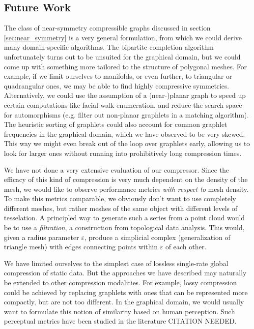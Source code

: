 \documentclass{egpubl}
\begin{document}
\subsection{Future Work}


The class of near-symmetry compressible graphs discussed in section \ref{sec:near_symmetry} is a very general formulation, from which we could derive many domain-specific algorithms. The bipartite completion algorithm unfortunately turns out to be unsuited for the graphical domain, but we could come up with something more tailored to the structure of polygonal meshes. For example, if we limit ourselves to manifolds, or even further, to triangular or quadrangular ones, we may be able to find highly compressive symmetries.
Alternatively, we could use the assumption of a (near-)planar graph to speed up certain computations like facial walk enumeration, %
and reduce the search space for automorphisms (e.g. filter out non-planar graphlets in a matching algorithm).
The heuristic sorting of graphlets could also account for common graphlet frequencies in the graphical domain, which we have observed to be very skewed. This way we might even break out of the loop over graphlets early, allowing us to look for larger ones without running into prohibitively long compression times.

We have not done a very extensive evaluation of our compressor. Since the efficacy of this kind of compression is very much dependent on the density of the mesh, we would like to observe performance metrics \textit{with respect to} mesh density. To make this metrics comparable, we obviously don't want to use completely different meshes, but rather meshes of the same object with different levels of tesselation. 
A principled way to generate such a series from a point cloud would be to use a \textit{filtration}, a construction from topological data analysis. This would, given a radius parameter $\varepsilon$, produce a simplicial complex (generalization of triangle mesh) with edges connecting points within $\varepsilon$ of each other. %

We have limited ourselves to the simplest case of lossless single-rate global compression of static data. But the approaches we have described may naturally be extended to other compression modalities. For example, lossy compression could be achieved by replacing graphlets with ones that can be represented more compactly, but are not too different. In the graphical domain, we would usually want to formulate this notion of similarity based on human perception. Such perceptual metrics have been studied in the literature
CITATION NEEDED. %



%



\end{document}

